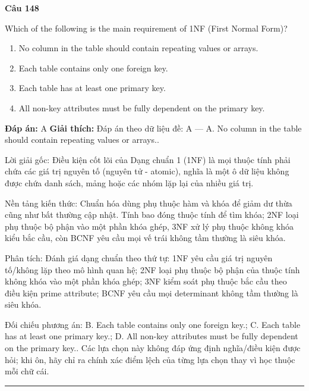 \documentclass[11pt,a4paper]{article}
\newenvironment{question}[1]{%
  \par\vspace{1em}\noindent\textbf{\large Câu #1}\par\vspace{0.4em}
}{%
  \par\vspace{1em}\hrule\vspace{0.6em}
}
\newenvironment{choices}{%
  \begin{enumerate}[label=\textbf{\Alph*.},leftmargin=2.2em,itemsep=2pt,topsep=3pt]
}{%
  \end{enumerate}
}
\newcommand{\choice}{\item}
\begin{document}
\begin{question}{148}
Which of the following is the main requirement of 1NF (First Normal Form)?
\begin{choices}
\choice No column in the table should contain repeating values or arrays.
\choice Each table contains only one foreign key.
\choice Each table has at least one primary key.
\choice All non-key attributes must be fully dependent on the primary key.
\end{choices}
\textbf{Đáp án:} A
\textbf{Giải thích:} Đáp án theo dữ liệu đề: A — A. No column in the table should contain repeating values or arrays..

Lời giải gốc: Điều kiện cốt lõi của Dạng chuẩn 1 (1NF) là mọi thuộc tính phải chứa các giá trị nguyên tố (nguyên tử - atomic), nghĩa là một ô dữ liệu không được chứa danh sách, mảng hoặc các nhóm lặp lại của nhiều giá trị.

Nền tảng kiến thức: Chuẩn hóa dùng phụ thuộc hàm và khóa để giảm dư thừa cũng như bất thường cập nhật. Tính bao đóng thuộc tính để tìm khóa; 2NF loại phụ thuộc bộ phận vào một phần khóa ghép, 3NF xử lý phụ thuộc không khóa kiểu bắc cầu, còn BCNF yêu cầu mọi vế trái không tầm thường là siêu khóa.

Phân tích: Đánh giá dạng chuẩn theo thứ tự: 1NF yêu cầu giá trị nguyên tố/không lặp theo mô hình quan hệ; 2NF loại phụ thuộc bộ phận của thuộc tính không khóa vào một phần khóa ghép; 3NF kiểm soát phụ thuộc bắc cầu theo điều kiện prime attribute; BCNF yêu cầu mọi determinant không tầm thường là siêu khóa.

Đối chiếu phương án: B. Each table contains only one foreign key.; C. Each table has at least one primary key.; D. All non-key attributes must be fully dependent on the primary key.. Các lựa chọn này không đáp ứng định nghĩa/điều kiện được hỏi; khi ôn, hãy chỉ ra chính xác điểm lệch của từng lựa chọn thay vì học thuộc mỗi chữ cái.
\end{question}
\end{document}
